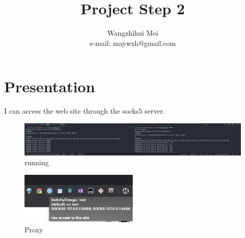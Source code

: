 \documentclass[a4paper,10pt]{article}
\begin{document}
%
   \title{Project Step 2}

   \author{Wangzhihui Mei \\ e-mail: maywzh@gmail.com}
          
   \date{}

   \maketitle
   
  \newpage
    
\section*{Presentation}
  I can access the web site through the socks5 server.

  \begin{figure}[h]
    \centering
    \includegraphics[width=1.0\textwidth]{image/f1.png}
    \caption{running}
  \end{figure}

  \begin{figure}[h]
    \centering
    \includegraphics[width=0.5\textwidth]{image/f2.png}
    \caption{Proxy}
  \end{figure}
\end{document}
